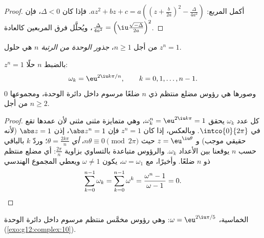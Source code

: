 \begin{proof}
أكمل المربع:
$az^2 + bz + c = a\left(\left(z + \frac{b}{2a}\right)^2 -
\frac{\Delta}{4a^2}\right)$. فإذا كان $\Delta < 0$، فإن
$\frac{\Delta}{4a^2} = \left(\iu\frac{\sqrt{-\Delta}}{2a}\right)^2$، ويُحلَّل
فرق المربعين كالعادة.
\end{proof}

\begin{definition}\label{def:g12:complex:rootsofunity}
من أجل $n \geq 1$، \emph{جذور الوحدة من الرتبة $n$} هي
حلول  $z^n = 1$.
\end{definition}

\begin{theorem}\label{thm:g12:complex:rootsofunity}
 $z^n = 1$ بالضبط $n$ حلًا:
\[
\omega_k = \eu^{2\iu k\pi/n}, \qquad k = 0, 1, \dots, n-1 .
\]
وصورها هي رؤوس مضلع منتظم ذي $n$ ضلعًا مرسوم داخل دائرة
الوحدة، ومجموعها $0$ من أجل $n \geq 2$.
\end{theorem}

\begin{proof}
كل عدد $\omega_k$ يحقق $\omega_k^n = \eu^{2\iu k\pi} = 1$، وهي متمايزة
مثنى مثنى لأن عمدها تقع في $\intco{0}{2\pi}$.
وبالعكس، إذا كان $z^n = 1$ فإن $\abs z^n = 1$، إذن $\abs z = 1$ (لأنه حقيقي
موجب) و $z = \eu^{\iu\theta}$ حيث $n\theta \equiv 0 \pmod{2\pi}$،
\emph{أي} $\theta = \frac{2k\pi}{n}$؛ وردّ $k$ بالباقي حسب $n$ يوقعنا بين
الأعداد $\omega_k$. والرؤوس متباعدة بالتساوي بزاوية $\frac{2\pi}{n}$:
أي مضلع منتظم ذو $n$ ضلعًا. وأخيرًا، مع $\omega = \omega_1$،
يكون $\omega \neq 1$ ويعطي المجموع الهندسي
\[
\sum_{k=0}^{n-1}\omega_k = \sum_{k=0}^{n-1}\omega^k
= \frac{\omega^n - 1}{\omega - 1} = 0 . \qedhere
\]
\end{proof}

\begin{omfigure}

{\small {} الخماسية، $\omega = \eu^{2\iu\pi/5}$: وهي
رؤوس مخمَّس منتظم مرسوم داخل دائرة الوحدة
(\cref{exo:g12:complex:10}).}
\end{omfigure}

